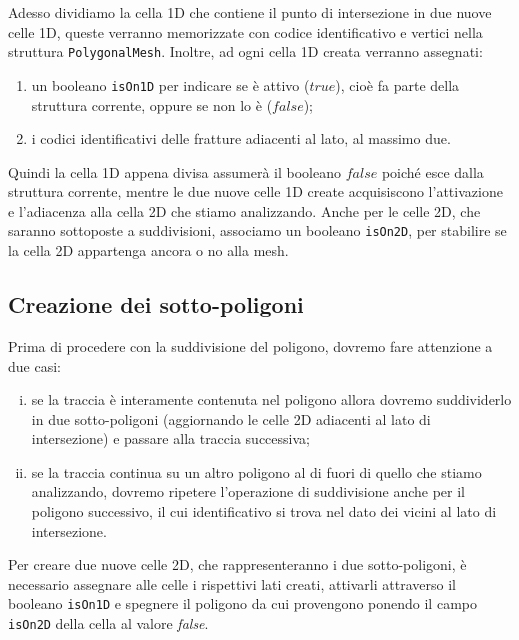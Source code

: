 \documentclass[a4paper]{article}
\begin{document}
Adesso dividiamo la cella 1D che contiene il punto di intersezione in due nuove celle 1D, queste verranno memorizzate con codice identificativo e vertici nella struttura \texttt{PolygonalMesh}. Inoltre, ad ogni cella 1D creata verranno assegnati: 
\begin{enumerate} 
\item un booleano \texttt{isOn1D} per indicare se è attivo ($true$), cioè fa parte della struttura corrente, oppure se non lo è ($false$);
\item i codici identificativi delle fratture adiacenti al lato, al massimo due.
\end{enumerate}

Quindi la cella 1D appena divisa assumerà il booleano $false$ poiché esce dalla struttura corrente, mentre le due nuove celle 1D create acquisiscono l'attivazione e l'adiacenza alla cella 2D che stiamo analizzando. Anche per le celle 2D, che saranno sottoposte a suddivisioni, associamo un booleano \texttt{isOn2D}, per stabilire se la cella 2D appartenga ancora o no alla mesh.

\subsection{Creazione dei sotto-poligoni}
Prima di procedere con la suddivisione del poligono, dovremo fare attenzione a due casi: 
\begin{enumerate} [(i)]
\item se la traccia è interamente contenuta nel poligono allora dovremo suddividerlo in due sotto-poligoni (aggiornando le celle 2D adiacenti al lato di intersezione) e passare alla traccia successiva;
\item se la traccia continua su un altro poligono al di fuori di quello che stiamo analizzando, dovremo ripetere l'operazione di suddivisione anche per il poligono successivo, il cui identificativo si trova nel dato dei vicini al lato di intersezione.
\end{enumerate}

Per creare due nuove celle 2D, che rappresenteranno i due sotto-poligoni, è necessario assegnare alle celle i rispettivi lati creati, attivarli attraverso il booleano \texttt{isOn1D} e spegnere il poligono da cui provengono ponendo il campo \texttt{isOn2D} della cella al valore \emph{false}.
\end{document}
